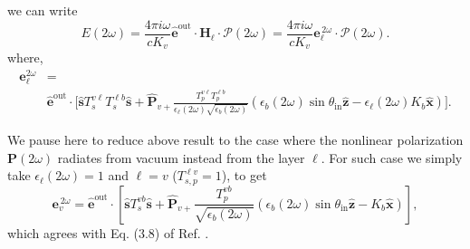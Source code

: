 \documentclass[10pt]{article}
\begin{document}
we can write
\begin{equation*}\label{r10}
E(2\omega) = \frac{4\pi i \omega}{cK_{v}}
\hat{\mathbf{e}}^{\mathrm{out}}\cdot
\mathbf{H}_{\ell}\cdot
\boldsymbol{\mathcal{P}}(2\omega) 
= \frac{4\pi i\omega}{cK_{v}}
  \mathbf{e}^{\,2\omega}_{\ell}\cdot\boldsymbol{\mathcal{P}}(2\omega). 
\end{equation*}
where,
\begin{equation}\label{r12}
\begin{split}
\mathbf{e}^{2\omega}_{\ell} &= \\ &\hat{\mathbf{e}}^{\mathrm{out}}\cdot
\Bigg[
\hat{\mathbf{s}}T_{s}^{v\ell}T_{s}^{\ell b}\hat{\mathbf{s}} + 
\hat{\mathbf{P}}_{v+}
\frac{T^{v\ell}_{p}T^{\ell b}_{p}}
     {\epsilon_{\ell}({2\omega})\sqrt{\epsilon_{b}(2\omega)}}
\left(
  \epsilon_{b}(2\omega)\sin\theta_{\mathrm{in}}\hat{\mathbf{z}}
- \epsilon_{\ell}(2\omega)K_{b}\hat{\mathbf{x}}
\right)
\Bigg]
.
\end{split}
\end{equation}  

We pause here to reduce above result to the case where the nonlinear
polarization $\mathbf{P}(2\omega)$ radiates from vacuum instead from the layer
$\ell$. For such case we simply take $\epsilon_{\ell}(2\omega)=1$ and $\ell=v$
($T^{\ell v}_{s,p}=1$), to get
\begin{equation}\label{r13}
\mathbf{e}^{\,2\omega}_{v} = \hat{\mathbf{e}}^{\mathrm{out}}
\cdot\left[
\hat{\mathbf{s}}T_s^{v b}\hat{\mathbf{s}} + \hat{\mathbf{P}}_{v+}
\frac{T^{v b}_{p}}{\sqrt{\epsilon_{b}(2\omega)}}
\left(
  \epsilon_{b}(2\omega)\sin\theta_{\mathrm{in}}\hat{\mathbf{z}}
  - K_{b}\hat{\mathbf{x}}
\right) 
\right] 
,
\end{equation}
which agrees with Eq. (3.8) of Ref. \cite{mizrahiJOSA88}.
\end{document}
